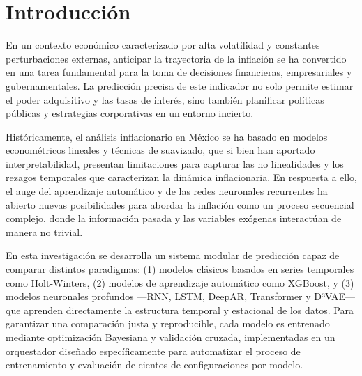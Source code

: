 \documentclass[12pt,letterpaper]{article}
\begin{document}
\clearpage


\clearpage
{}
{}
\tableofcontents

\clearpage
{}
{}
\listoftables

\clearpage
{}
{}
\listoffigures


\clearpage
{}




\section{Introducción}
En un contexto económico caracterizado por alta volatilidad y constantes perturbaciones externas, anticipar la trayectoria de la inflación se ha convertido en una tarea fundamental para la toma de decisiones financieras, empresariales y gubernamentales. La predicción precisa de este indicador no solo permite estimar el poder adquisitivo y las tasas de interés, sino también planificar políticas públicas y estrategias corporativas en un entorno incierto.

Históricamente, el análisis inflacionario en México se ha basado en modelos econométricos lineales y técnicas de suavizado, que si bien han aportado interpretabilidad, presentan limitaciones para capturar las no linealidades y los rezagos temporales que caracterizan la dinámica inflacionaria. En respuesta a ello, el auge del aprendizaje automático y de las redes neuronales recurrentes ha abierto nuevas posibilidades para abordar la inflación como un proceso secuencial complejo, donde la información pasada y las variables exógenas interactúan de manera no trivial.

En esta investigación se desarrolla un sistema modular de predicción capaz de comparar distintos paradigmas: (1) modelos clásicos basados en series temporales como Holt-Winters, (2) modelos de aprendizaje automático como XGBoost, y (3) modelos neuronales profundos —RNN, LSTM, DeepAR, Transformer y D³VAE— que aprenden directamente la estructura temporal y estacional de los datos. Para garantizar una comparación justa y reproducible, cada modelo es entrenado mediante optimización Bayesiana y validación cruzada, implementadas en un orquestador diseñado específicamente para automatizar el proceso de entrenamiento y evaluación de cientos de configuraciones por modelo.
\end{document}
